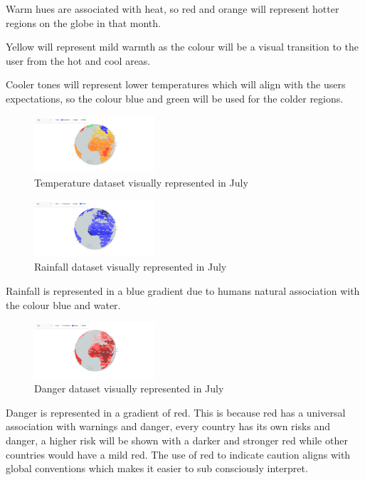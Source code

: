 \documentclass[]{project_final}
\begin{document}
Warm hues are associated with heat, so red and orange will represent hotter regions on the globe in that month.

Yellow will represent mild warmth as the colour will be a visual transition to the user from the hot and cool areas.

Cooler tones will represent lower temperatures which will align with the users expectations, so the colour blue and green will be used for the colder regions.

\begin{figure}[ht!]
  \centering
  \includegraphics[width=0.4\textwidth]{4.png}
  \caption{Temperature dataset visually represented in July}
  \label{fig:1}
\end{figure}

\begin{figure}[ht!]
  \centering
  \includegraphics[width=0.4\textwidth]{5.png}
  \caption{Rainfall dataset visually represented in July}
  \label{fig:1}
\end{figure}
Rainfall is represented in a blue gradient due to humans natural association with the colour blue and water.


\begin{figure}[ht!]
  \centering
  \includegraphics[width=0.4\textwidth]{6.png}
  \caption{Danger dataset visually represented in July}
  \label{fig:1}
\end{figure}
Danger is represented in a gradient of red. This is because red has a universal association with warnings and danger, every country has its own risks and danger, a higher risk will be shown with a darker and stronger red while other countries would have a mild red. The use of red to indicate caution aligns with global conventions which makes it easier to sub consciously interpret.
\end{document}

